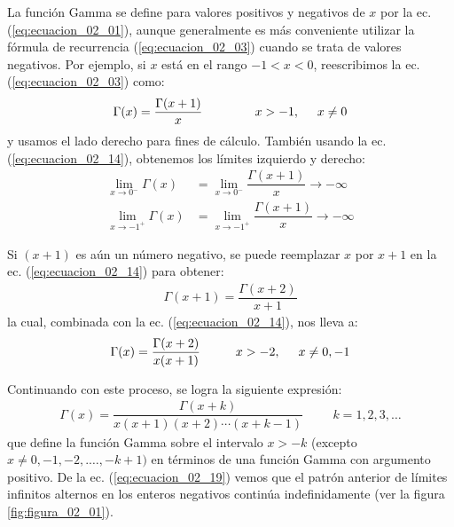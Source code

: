 La función Gamma se define para valores positivos y negativos de $x$ por la ec. (\ref{eq:ecuacion_02_01}), aunque generalmente es más conveniente utilizar la fórmula de recurrencia (\ref{eq:ecuacion_02_03}) cuando se trata de valores negativos. Por ejemplo, si $x$ está en el rango $-1 < x < 0$, reescribimos la ec. (\ref{eq:ecuacion_02_03}) como:
\begin{align}
\Gamma (x) = \dfrac{\Gamma (x + 1)}{x} \hspace{1.5cm} x > -1, \hspace{0.5cm} x \neq 0
\label{eq:ecuacion_02_14}
\end{align}
y usamos el lado derecho para fines de cálculo. También usando la ec. (\ref{eq:ecuacion_02_14}), obtenemos los límites izquierdo y derecho:
\begin{align}
\lim_{x \to 0^{-}} \Gamma (x) &= \lim_{x \to 0^{-}} \dfrac{\Gamma (x + 1)}{x} \to -\infty \label{eq:ecuacion_02_15} \\[0.5em]
\lim_{x \to -1^{+}} \Gamma (x) &= \lim_{x \to -1^{+}} \dfrac{\Gamma (x + 1)}{x} \to -\infty \label{eq:ecuacion_02_16}
\end{align}

Si $(x + 1)$ es aún un número negativo, se puede reemplazar $x$ por $x + 1$ en la ec. (\ref{eq:ecuacion_02_14}) para obtener:
\begin{align*}
\Gamma (x + 1) = \dfrac{\Gamma (x + 2)}{x + 1}
\end{align*}
la cual, combinada con la ec. (\ref{eq:ecuacion_02_14}), nos lleva a:
\begin{align*}
\Gamma (x) = \dfrac{\Gamma (x + 2)}{x (x + 1)} \hspace{1cm} x > -2 , \hspace{0.5cm} x \neq 0, -1
\end{align*}

Continuando con este proceso, se logra la siguiente expresión:
\begin{align}
\Gamma (x) = \dfrac{\Gamma (x + k)}{x (x + 1)(x + 2) \cdots (x + k - 1)} \hspace{1cm} k = 1, 2, 3, \ldots
\label{eq:ecuacion_02_19}
\end{align}
que define la función Gamma sobre el intervalo $x > -k$ (excepto \break \hfill $x \neq 0, -1, -2, .\ldots , -k + 1)$ en términos de una función Gamma con argumento positivo. De la ec. (\ref{eq:ecuacion_02_19}) vemos que el patrón anterior de límites infinitos alternos en los enteros negativos continúa indefinidamente (ver la figura \ref{fig:figura_02_01}).

